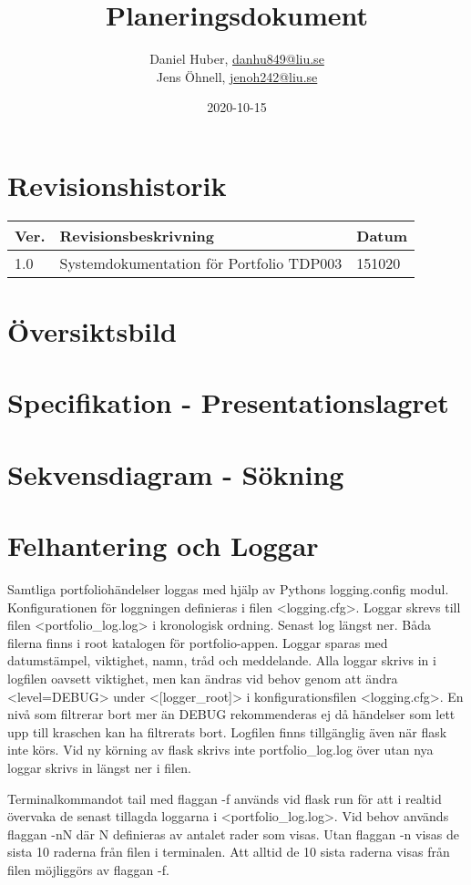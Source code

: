 \documentclass{TDP003mall}
\author{Daniel Huber, \url{danhu849@liu.se}\\
  Jens Öhnell, \url{jenoh242@liu.se}}
\title{Planeringsdokument}
\date{2020-10-15}
\begin{document}
\projectpage
\section{Revisionshistorik}
\begin{table}[!h]
\begin{tabularx}{\linewidth}{|l|X|l|}
\hline
Ver. & Revisionsbeskrivning & Datum \\\hline
1.0 & Systemdokumentation för Portfolio TDP003 & 151020 \\\hline
\end{tabularx}
\end{table}


\section{Översiktsbild}

\section{Specifikation - Presentationslagret}

\section{Sekvensdiagram - Sökning}



\section{Felhantering och Loggar}
Samtliga portfoliohändelser loggas med hjälp av Pythons logging.config modul. Konfigurationen för loggningen definieras i filen <logging.cfg>. Loggar skrevs till filen <portfolio\_log.log> i kronologisk ordning. Senast log längst ner. Båda filerna finns i root katalogen för portfolio-appen. Loggar sparas med datumstämpel, viktighet, namn, tråd och meddelande. Alla loggar skrivs in i logfilen oavsett viktighet, men kan ändras vid behov genom att ändra <level=DEBUG> under <[logger\_root]> i konfigurationsfilen <logging.cfg>. En nivå som filtrerar bort mer än DEBUG rekommenderas ej då händelser som lett upp till kraschen kan ha filtrerats bort. Logfilen finns tillgänglig även när flask inte körs. Vid ny körning av flask skrivs inte portfolio\_log.log över utan nya loggar skrivs in längst ner i filen.

Terminalkommandot tail med flaggan -f används vid flask run för att i realtid övervaka de senast tillagda loggarna i <portfolio\_log.log>. Vid behov används flaggan -nN där N definieras av antalet rader som visas. Utan flaggan -n visas de sista 10 raderna från filen i terminalen. Att alltid de 10 sista raderna visas från filen möjliggörs av flaggan -f.
\end{document}

